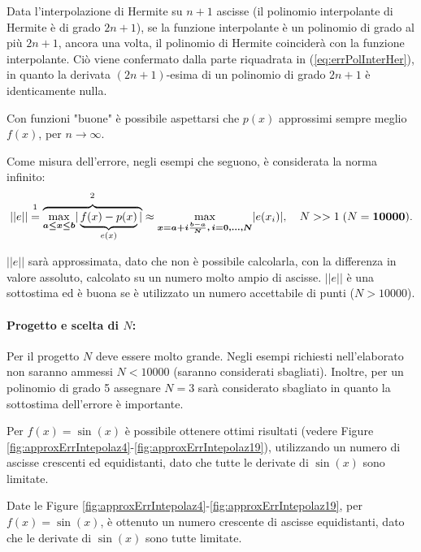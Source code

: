 Data l'interpolazione di Hermite su $n+1$ ascisse (il polinomio interpolante di Hermite è di grado $2n+1$), se la funzione interpolante è un polinomio di grado al più $2n+1$, ancora una volta, il polinomio di Hermite coinciderà con la funzione interpolante. Ciò viene confermato dalla parte riquadrata in (\ref{eq:errPolInterHer}), in quanto la derivata $(2n+1)$-esima di un polinomio di grado $2n+1$ è identicamente nulla.

Con funzioni "buone" è possibile aspettarsi che $p(x)$ approssimi sempre meglio $f(x)$, per $n\rightarrow\infty$.

Come misura dell'errore, negli esempi che seguono, è considerata la norma infinito:
\begin{equation*}
    ||e||\overset{\footnotemark}{=} \overbrace{\underset{\boldsymbol{a\leq x\leq b}}{\max}|\underbrace{f(x)-p(x)}_{e(x)}|}^{\footnotemark}\approx \underset{\boldsymbol{x=a+i\frac{b-a}{N},\, i=0,\hdots,N}}{\max}|e(x_i)|,\quad N>>1\; (N=\boldsymbol{10000}).
\end{equation*}
\addtocounter{footnote}{-1}

$||e||$ sarà approssimata, dato che non è possibile calcolarla, con la differenza in valore assoluto, calcolato su un numero molto ampio di ascisse. $||e||$ è una sottostima ed è buona se è utilizzato un numero accettabile di punti ($N>10000$).

\paragraph{Progetto e scelta di $N$:} Per il progetto $N$ deve essere molto grande. Negli esempi richiesti nell'elaborato non saranno ammessi $N<10000$ (saranno considerati sbagliati). Inoltre, per un polinomio di grado 5 assegnare $N=3$ sarà considerato sbagliato in quanto la sottostima dell'errore è importante.

\begin{example}
    Per $f(x)=\sin(x)$ è possibile ottenere ottimi risultati (vedere Figure \ref{fig:approxErrIntepolaz4}-\ref{fig:approxErrIntepolaz19}), utilizzando un numero di ascisse crescenti ed equidistanti, dato che tutte le derivate di $\sin(x)$ sono limitate.

    Date le Figure \ref{fig:approxErrIntepolaz4}-\ref{fig:approxErrIntepolaz19}, per $f(x)=\sin(x)$, è ottenuto un numero crescente di ascisse equidistanti, dato che le derivate di $\sin(x)$ sono tutte limitate.
\end{example}

